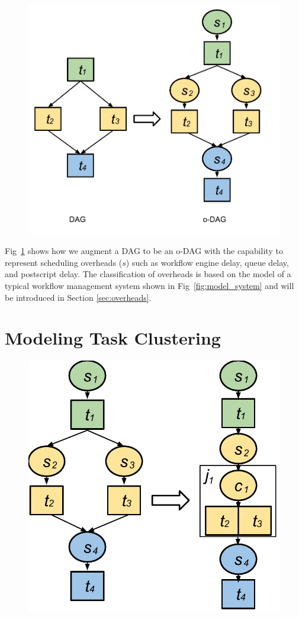 


\begin{figure}[h!]
\includegraphics[width=0.6\linewidth]{figures/model/odag.pdf}
\centering
  \label{fig:model_odag}
\end{figure}

Fig~\ref{fig:model_odag} shows how we augment a DAG to be an o-DAG with the capability to represent scheduling overheads ($s$) such as workflow engine delay, queue delay, and postscript delay. The classification of overheads is based on the model of a typical workflow management system shown in Fig~\ref{fig:model_system} and will be introduced in Section \ref{sec:overheads}. 


\section{Modeling Task Clustering}
\label{sec:task_clustering}

\begin{figure}[h!]
\centering
 \includegraphics[width=0.5\linewidth]{figures/introduction/hc.pdf}
  \label{fig:intro_hc}
\end{figure}


